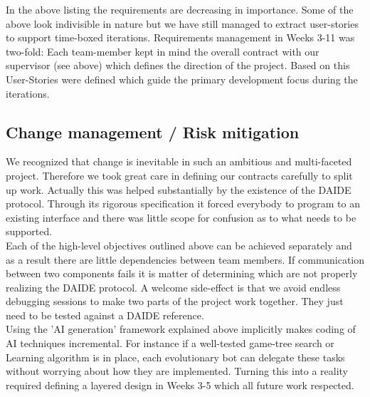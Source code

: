\documentclass[11pt]{article} \usepackage{fullpage} \usepackage{cite}
\begin{document}
In the above listing the requirements are decreasing in importance. Some of the
above look indivisible in nature but we have still managed to extract
user-stories to support time-boxed iterations. Requirements management in Weeks
3-11 was two-fold: Each team-member kept in mind the overall contract with our
supervisor (see above) which defines the direction of the project.  Based on
this User-Stories were defined which guide the primary development focus during
the iterations.

\subsection{Change management / Risk mitigation}
We recognized that change is inevitable in such an ambitious and multi-faceted
project. Therefore we took great care in defining our contracts carefully to
split up work. Actually this was helped substantially by the existence of the
DAIDE protocol. Through its rigorous specification it forced everybody to
program to an existing interface and there was little scope for confusion as to
what needs to be supported.  \\ Each of the high-level objectives outlined above
can be achieved separately and as a result there are little dependencies between
team members.  If communication between two components fails it is matter of
determining which are not properly realizing the DAIDE protocol. A welcome
side-effect is that we avoid endless debugging sessions to make two parts of the
project work together. They just need to be tested against a DAIDE reference.
\\ Using the 'AI generation' framework explained above implicitly makes coding
of AI techniques incremental. For instance if a well-tested game-tree search or
Learning algorithm is in place, each evolutionary bot can delegate these tasks
without worrying about how they are implemented. Turning this into a reality
required defining a layered design in Weeks 3-5 which all future work respected.
\\
\end{document}

